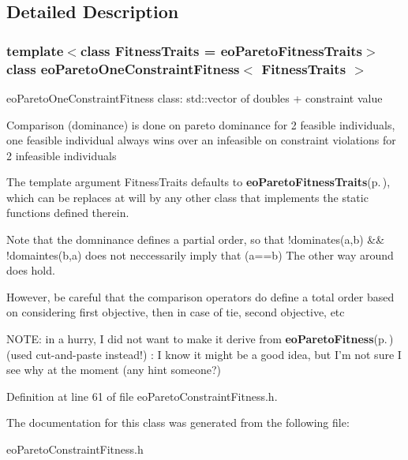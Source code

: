 \subsection{Detailed Description}
\subsubsection*{template$<$class Fitness\-Traits = eo\-Pareto\-Fitness\-Traits$>$ class eo\-Pareto\-One\-Constraint\-Fitness$<$ Fitness\-Traits $>$}

eo\-Pareto\-One\-Constraint\-Fitness class: std::vector of doubles + constraint value 

Comparison (dominance) is done on pareto dominance for 2 feasible individuals, one feasible individual always wins over an infeasible on constraint violations for 2 infeasible individuals

The template argument Fitness\-Traits defaults to {\bf eo\-Pareto\-Fitness\-Traits}{\rm (p.\,\pageref{classeo_pareto_fitness_traits})}, which can be replaces at will by any other class that implements the static functions defined therein.

Note that the domninance defines a partial order, so that !dominates(a,b) \&\& !domaintes(b,a) does not neccessarily imply that (a==b) The other way around does hold.

However, be careful that the comparison operators do define a total order based on considering first objective, then in case of tie, second objective, etc

NOTE: in a hurry, I did not want to make it derive from {\bf eo\-Pareto\-Fitness}{\rm (p.\,\pageref{classeo_pareto_fitness})} (used cut-and-paste instead!) : I know it might be a good idea, but I'm not sure I see why at the moment (any hint someone?) 



Definition at line 61 of file eo\-Pareto\-Constraint\-Fitness.h.

The documentation for this class was generated from the following file:\begin{CompactItemize}
\item 
eo\-Pareto\-Constraint\-Fitness.h\end{CompactItemize}
